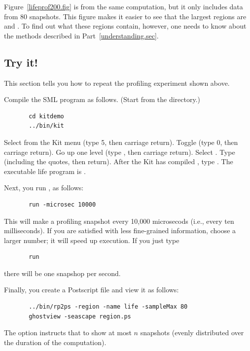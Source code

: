 \documentclass[12pt]{book}
\begin{document}
Figure~\ref{lifeprof200.fig} is from the same computation, but it only includes
data from 80 snapshots. This figure makes it easier to see that the largest
regions are  and . To find out what these regions contain,
however, one needs to know about the methods described in Part~\ref{understanding.sec}.

\subsection{Try it!}
This section tells you how to repeat the profiling experiment shown above. 

Compile the SML program  as follows. (Start from
 the  directory.)
\begin{verbatim}
       cd kitdemo
       ../bin/kit
\end{verbatim}
Select  from the Kit menu (type 5, then carriage return).
Toggle  (type 0, then carriage return). Go up one
level (type , then carriage return). Select .
Type  (including the quotes, then return). After the Kit has compiled
, type . The executable life program
is .

Next, you run , as follows:
\begin{verbatim}
       run -microsec 10000
\end{verbatim}
This will make a profiling snapshot every 10,000 microsecods (i.e., every 
ten milliseconds). If you are satisfied with less fine-grained information,
choose a larger number; it will speed up execution. If you just type
\begin{verbatim}
       run 
\end{verbatim}
there will be one snapshop per second.

Finally, you create a Postscript file and view it as follows:
\begin{verbatim}
       ../bin/rp2ps -region -name life -sampleMax 80 
       ghostview -seascape region.ps
\end{verbatim}
The option  instructs  that
to show at most $n$ snapshots (evenly distributed
over the duration of the computation).
\end{document}
